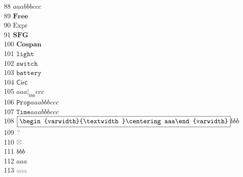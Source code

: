 \documentclass[11pt, book]{memoir}
\theoremstyle{plain}
\theoremstyle{plain}
\theoremstyle{remark}
\newcommand{\const}[1]{\mathtt{#1}}%
\newcommand{\Cat}[1]{\mathbf{#1}}%
\newcommand{\Fun}[1]{\mathsf{#1}}%
\newcommand{\ord}[1]{\underline{{#1}}}
\newcommand{\free}{\Cat{Free}}
\newcommand{\expr}{\mathrm{Expr}}
\newcommand{\sfg}{\mathbf{SFG}}
\newcommand\addgen{\lower8pt\hbox{$\texttt{[image: pics/add.pdf]}$}}
\newcommand\zerogen{\lower5pt\hbox{$\texttt{[image: pics/zero.pdf]}$}}
\newcommand\delaygen{\lower6pt\hbox{$\texttt{[image: pics/delay.pdf]}$}}
\newcommand\scalargen{\lower6pt\hbox{$\texttt{[image: pics/scalar.pdf]}$}}
\newcommand\copyopgen{\lower8pt\hbox{$\texttt{[image: pics/copyop.pdf]}$}}
\newcommand\discardopgen{\lower5pt\hbox{$\texttt{[image: pics/discardop.pdf]}$}}
\newcommand\twist{\lower6pt\hbox{$\texttt{[image: pics/twist.pdf]}$}}
\newcommand{\oprdset}{\mathbf{Set}}
\newcommand{\oprdcospan}{\mathbf{Cospan}}
\newcommand{\light}{\texttt{light}}
\newcommand{\switch}{\texttt{switch}}
\newcommand{\battery}{\texttt{battery}}
\newcommand{\elec}{\Fun{Circ}}
\newcommand{\restrict}[2]{#1\big|_{#2}}
\newcommand{\Prop}{\const{Prop}}
\newcommand{\Time}{\const{Time}}
\newcommand{\boxCD}[2][black]{\fcolorbox{#1}{white}{\begin{varwidth}{\textwidth}\centering #2\end{varwidth}}}
\newcommand{\?}{{\color{gray}{?}}}
\newcommand{\DNE}{{\color{gray}{\boxtimes}}}
\newcommand{\erase}[2][]{{\color{red}#1}}
\newcommand{\showhide}[2]{#1}
\newcommand{\overtime}[1]{{\color{gray}#1}}
\begin{document}
 88 $\ord{aaa}{bbb}{ccc}$ \\
 89 $\free$ \\
 90 $\expr$ \\
 91 $\sfg$ \\
100 $\oprdcospan$ \\
101 $\light$ \\
102 $\switch$ \\
103 $\battery$ \\
104 $\elec$ \\
105 $\restrict{aaa}{bbb}{ccc}$ \\
106 $\Prop{aaa}{bbb}{ccc}$ \\
107 $\Time{aaa}{bbb}{ccc}$ \\
108 $\boxCD{aaa}{bbb}$ \\
109 $\?$ \\
110 $\DNE$ \\
111 $\erase{aaa}{bbb}$ \\
112 $\showhide{aaa}{bbb}$ \\
113 $\overtime{aaa}$ \\
\end{document}
